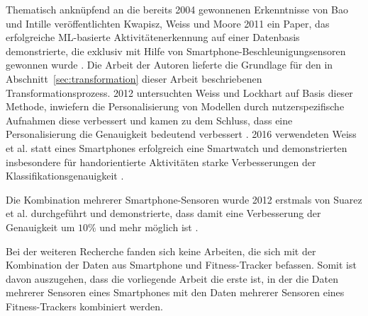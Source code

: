 Thematisch anknüpfend an die bereits 2004 gewonnenen Erkenntnisse von Bao und Intille veröffentlichten Kwapisz, Weiss und Moore 2011 ein Paper, das erfolgreiche \ac{ML}-basierte Aktivitätenerkennung auf einer Datenbasis demonstrierte, die exklusiv mit Hilfe von Smartphone-Beschleunigungsensoren gewonnen wurde \cite{Kwapisz2011}. Die Arbeit der Autoren lieferte die Grundlage für den in Abschnitt~\ref{sec:transformation} dieser Arbeit beschriebenen Transformationsprozess. 2012 untersuchten Weiss und Lockhart auf Basis dieser Methode, inwiefern die Personalisierung von Modellen durch nutzerspezifische Aufnahmen diese verbessert und kamen zu dem Schluss, dass eine Personalisierung die Genauigkeit bedeutend verbessert \cite{Weiss2012}. 2016 verwendeten Weiss et al. statt eines Smartphones erfolgreich eine Smartwatch und demonstrierten insbesondere für handorientierte Aktivitäten starke Verbesserungen der Klassifikationsgenauigkeit \cite{Weiss2016}.

Die Kombination mehrerer Smartphone-Sensoren wurde 2012 erstmals von Suarez et al. durchgeführt und demonstrierte, dass damit eine Verbesserung der Genauigkeit um $10 \%$ und mehr möglich ist \cite{Dernbach2012}.

Bei der weiteren Recherche fanden sich keine Arbeiten, die sich mit der Kombination der Daten aus Smartphone und Fitness-Tracker befassen. Somit ist davon auszugehen, dass die vorliegende Arbeit die erste ist, in der die Daten mehrerer Sensoren eines Smartphones mit den Daten mehrerer Sensoren eines Fitness-Trackers kombiniert werden.


